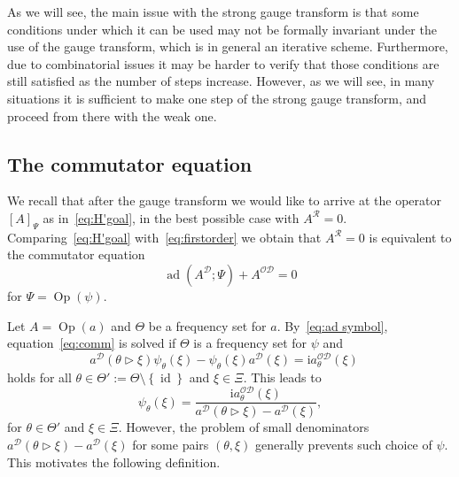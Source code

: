 \documentclass[10pt]{amsart}
\theoremstyle{definition}\newtheorem{defi}[theo]{Definition}\newtheorem{rema}[theo]{Remark}\newtheorem{exam}[theo]{Example}\newtheorem{nota}[theo]{Notation}
\DeclareMathOperator{\ad}{ad}
\DeclareMathOperator{\Op}{Op}
\DeclareMathOperator{\id}{id}
\newcommand{\rmi}{\mathrm{i}}
\newcommand{\CD}{\mathcal{D}}
\newcommand{\CO}{\mathcal{O}}
\newcommand{\CR}{\mathcal{R}}
\newcommand{\COD}{{\CO\CD}}
\newcommand{\act}{\triangleright}
\newcommand{\set}[1]{\left\{ #1 \right\}}
\begin{document}
As we will see, the main issue with the strong gauge transform is that some conditions under which it can be used may not be formally invariant under the use of the gauge transform, which is in general an iterative scheme. Furthermore, due to combinatorial issues it may be harder to verify that those conditions are still satisfied as the number of steps increase. However, as we will see, in many situations it is sufficient to make one step of the strong gauge transform, and proceed from there with the weak one.



\subsection{The commutator equation}
We recall that after the gauge transform we would like to arrive at the operator $[A]_\Psi$ as in~\eqref{eq:H'goal}, in the best possible case with $A^{\CR}=0$. Comparing~\eqref{eq:H'goal} with~\eqref{eq:firstorder} we obtain that $A^{\CR}=0$ is equivalent to the commutator equation
\begin{equation}\label{eq:comm}
\ad\left(A^\CD;\Psi\right) + A^{\COD} = 0
\end{equation}
for $\Psi = \Op(\psi)$.

Let $A=\Op(a)$ and $\Theta$ be a frequency set for $a$. By~\eqref{eq:ad symbol}, equation~\eqref{eq:comm} is solved if $\Theta$ is a frequency set for $\psi$ and
\begin{equation}
a^\CD(\theta \act \xi) \psi_\theta(\xi) - \psi_\theta(\xi)a^\CD(\xi) = \rmi a^\COD_\theta(\xi)\quad
\end{equation}
holds for all $\theta\in\Theta':=\Theta\setminus \set{\id}$ and $\xi\in\Xi$. This leads to
\begin{equation}\label{eq:eq}
\psi_\theta(\xi) = \frac{\rmi a^\COD_\theta(\xi)}{a^{\CD}(\theta\act\xi) - a^\CD(\xi)},
\end{equation}
for $\theta\in\Theta'$ and $\xi\in\Xi$. However, the problem of small denominators $a^\CD(\theta\act\xi) - a^\CD(\xi)$ for some pairs $(\theta,\xi)$ generally prevents such choice of $\psi$. This motivates the following definition.
\end{document}
